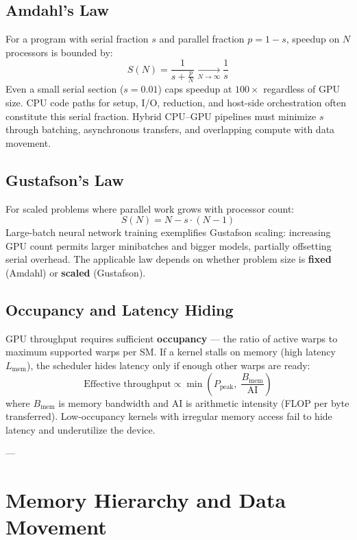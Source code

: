 \documentclass[11pt,journal,onecolumn]{IEEEtran}
\begin{document}
\subsection{Amdahl's Law}
For a program with serial fraction $s$ and parallel fraction $p = 1 - s$, speedup on $N$ processors is bounded by:
\begin{equation}
S(N) = \frac{1}{s + \frac{p}{N}} \xrightarrow[N \to \infty]{} \frac{1}{s}
\end{equation}
Even a small serial section ($s = 0.01$) caps speedup at $100\times$ regardless of GPU size. CPU code paths for setup, I/O, reduction, and host-side orchestration often constitute this serial fraction. Hybrid CPU--GPU pipelines must minimize $s$ through batching, asynchronous transfers, and overlapping compute with data movement.

\subsection{Gustafson's Law}
For scaled problems where parallel work grows with processor count:
\begin{equation}
S(N) = N - s \cdot (N - 1)
\end{equation}
Large-batch neural network training exemplifies Gustafson scaling: increasing GPU count permits larger minibatches and bigger models, partially offsetting serial overhead. The applicable law depends on whether problem size is \textbf{fixed} (Amdahl) or \textbf{scaled} (Gustafson).

\subsection{Occupancy and Latency Hiding}
GPU throughput requires sufficient \textbf{occupancy} --- the ratio of active warps to maximum supported warps per SM. If a kernel stalls on memory (high latency $L_{\mathrm{mem}}$), the scheduler hides latency only if enough other warps are ready:
\begin{equation}
\text{Effective throughput} \propto \min\!\left(P_{\mathrm{peak}},\; \frac{B_{\mathrm{mem}}}{\mathrm{AI}}\right)
\end{equation}
where $B_{\mathrm{mem}}$ is memory bandwidth and $\mathrm{AI}$ is arithmetic intensity (FLOP per byte transferred). Low-occupancy kernels with irregular memory access fail to hide latency and underutilize the device.

---

\section{Memory Hierarchy and Data Movement}
\end{document}
